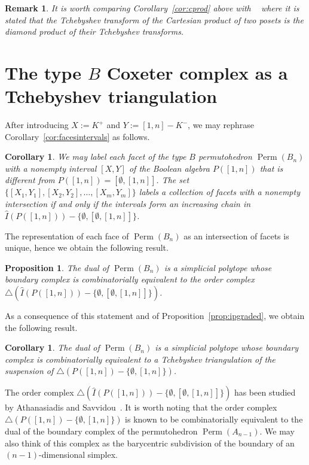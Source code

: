 \documentclass[reqno,12pt]{amsart}
\numberwithin{equation}{section}
\newtheorem{proposition}[theorem]{Proposition}
\newtheorem{corollary}[theorem]{Corollary}
\newtheorem{remark}[theorem]{Remark}
\newcommand{\0}{\widehat{0}}
\newcommand{\1}{\widehat{1}}
\newcommand{\2}{\widehat{2}}
\newcommand{\grI}{\widehat{I}}
\begin{document}
\begin{remark}
{\em It is worth comparing Corollary~\ref{cor:cprod} above with
  ~\cite[Theorem 9.1]{Ehrenborg-Readdy-Tch} where it is stated that the
  Tchebyshev transform of the Cartesian product of two posets is the
  diamond product of their Tchebyshev transforms.}
\end{remark}
  


\section{The type $B$ Coxeter complex as a Tchebyshev triangulation}
\label{sec:typeb}

After introducing $X:=K^+$ and $Y:=[1,n]-K^-$, we may rephrase
Corollary~\ref{cor:facesintervals} as follows.   
\begin{corollary}
We may label each facet of the type $B$ permutohedron
$\operatorname{Perm}(B_{n})$ with a nonempty interval $[X,Y]$ of the
Boolean algebra $P([1,n])$ that is different from $P([1,n])=[\emptyset, [1,n]]$. 
The set $\{[X_1,Y_1], [X_2,Y_2], \ldots, [X_m,Y_m]\}$ labels a
collection of facets with a nonempty intersection if and only if the
intervals form an increasing chain in $\grI(P([1,n]))-\{\emptyset,
[\emptyset, [1,n]]\}$.   
\end{corollary}  

The representation of each face of
$\operatorname{Perm}(B_{n})$ as an intersection of facets is
unique, hence we obtain the following result.

\begin{proposition}
The dual of $\operatorname{Perm}(B_{n})$ is a simplicial polytope whose
boundary complex is combinatorially equivalent to the order complex
$\triangle(\grI(P([1,n]))-\{\emptyset, [\emptyset, [1,n]]\})$.
\label{prop:tbc}
\end{proposition}  

As a consequence of this statement and of
Proposition~\ref{prop:ipgraded}, we obtain the following result. 
\begin{corollary}
\label{cor:typeb-tt}  
The dual of $\operatorname{Perm}(B_{n})$ is a simplicial polytope whose
boundary complex is combinatorially equivalent to a Tchebyshev
triangulation of the suspension of $\triangle(P([1,n])-\{\emptyset, [1,n]\})$.
\end{corollary}
The order complex $\triangle(\grI(P([1,n]))-\{\emptyset, [\emptyset,
  [1,n]]\})$ has been studied by
Athanasiadis and Savvidou~\cite{Athanasiadis-Savvidou}.  It is worth
noting that the order complex $\triangle(P([1,n])-\{\emptyset, [1,n]\})$ 
is known to be combinatorially equivalent to the dual of the boundary
complex of the permutohedron $\operatorname{Perm}(A_{n-1})$. We may also
think of this complex as the barycentric subdivision of the boundary of an
$(n-1)$-dimensional simplex. 
\end{document}
